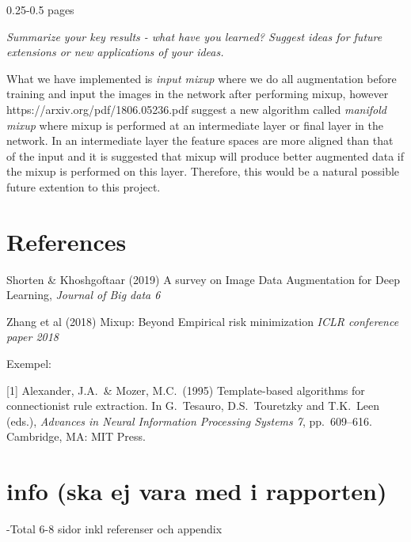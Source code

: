 \documentclass{article}
\begin{document}
0.25-0.5 pages

\textit{Summarize your key results - what have you learned? Suggest ideas for future extensions or new applications of your ideas.}

What we have implemented is \textit{input mixup} where we do all augmentation before training and input the images in the network after performing mixup, however https://arxiv.org/pdf/1806.05236.pdf 
suggest a new algorithm called \textit{manifold mixup} where mixup is performed at an intermediate layer or final layer in the network. In an intermediate layer 
the feature spaces are more aligned than that of the input and it is suggested that mixup will produce better augmented data if the mixup is performed on this layer. Therefore, this would be 
a natural possible future extention to this project. 


\section*{References}

Shorten \& Khoshgoftaar (2019) A survey on Image Data Augmentation for Deep Learning, \textit{Journal of Big data 6}

Zhang et al (2018) Mixup: Beyond Empirical risk minimization \textit{ICLR conference paper 2018}

Exempel:
\medskip

\small

[1] Alexander, J.A.\ \& Mozer, M.C.\ (1995) Template-based algorithms for
connectionist rule extraction. In G.\ Tesauro, D.S.\ Touretzky and T.K.\ Leen
(eds.), {\it Advances in Neural Information Processing Systems 7},
pp.\ 609--616. Cambridge, MA: MIT Press.

\section{info (ska ej vara med i rapporten)}

-Total 6-8 sidor inkl referenser och appendix
\end{document}

